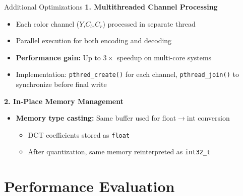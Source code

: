 \documentclass[10pt]{beamer}
\begin{document}
\begin{frame}{Additional Optimizations}
    \textbf{1. Multithreaded Channel Processing}
    \begin{itemize}
     \item Each color channel ($Y$,$C_b$,$C_r$) processed in separate thread
     \item Parallel execution for both encoding and decoding
     \item \textbf{Performance gain:} Up to $3\times$ speedup on multi-core systems
     \item Implementation: \texttt{pthred\_create()} for each channel, \texttt{pthread\_join()} to synchronize before final write
    \end{itemize}

    \vspace{0.3cm}
    \textbf{2. In-Place Memory Management}
    \begin{itemize}
     \item \textbf{Memory type casting:} Same buffer used for float$\rightarrow$int conversion
     \begin{itemize}
      \item DCT coefficients stored as \texttt{float}
      \item After quantization, same memory reinterpreted as \texttt{int32\_t}
     \end{itemize}
    \end{itemize}
\end{frame}

\section{Performance Evaluation}
\end{document}
